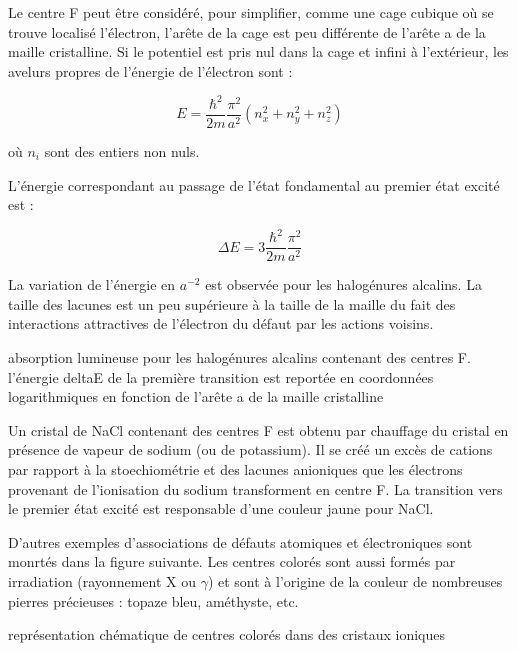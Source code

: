 Le centre F peut être considéré, pour simplifier, comme une cage cubique où se
trouve localisé l'électron, l'arête de la cage est peu différente de l'arête a
de la maille cristalline. Si le potentiel est pris nul dans la cage et infini à
l'extérieur, les avelurs propres de l'énergie de l'électron sont :
 
\begin{equation}
    E = \frac{\hbar^2}{2m}\frac{\pi^2}{a^2} (n_x^2 + n_y^2 + n_z^2)
\end{equation}

où $n_i$ sont des entiers non nuls.
 
L'énergie correspondant au passage de l'état fondamental au premier état excité
est :
 
\begin{equation}
    \Delta E = 3 \frac{\hbar^2}{2m} \frac{\pi^2}{a^2}
\end{equation}
 
La variation de l'énergie en $a^{-2}$ est observée pour les halogénures alcalins.
La taille des lacunes est un peu supérieure à la taille de la maille du fait des
interactions attractives de l'électron du défaut par les actions voisins.
 
\begin{marginfigure}
    \TODO
    \caption{absorption lumineuse pour les halogénures alcalins contenant des
    centres F. l'énergie deltaE de la première transition est reportée en
coordonnées logarithmiques en fonction de l'arête a de la maille cristalline}
    \label{abslumhalogalcal}
\end{marginfigure}
 
Un cristal de NaCl contenant des centres F est obtenu par chauffage du cristal
en présence de vapeur de sodium (ou de potassium). Il se créé un excès de
cations par rapport à la stoechiométrie et des lacunes anioniques que les
électrons provenant de l'ionisation du sodium transforment en centre F. La
transition vers le premier état excité est responsable d'une couleur jaune pour
NaCl.
 
D'autres exemples d'associations de défauts atomiques et électroniques sont
monrtés dans la figure suivante. Les centres colorés sont aussi formés par
irradiation (rayonnement X ou $\gamma$) et sont à l'origine de la couleur de
nombreuses pierres précieuses : topaze bleu, améthyste, etc.
 
\begin{marginfigure}
    \TODO
    \caption{représentation chématique de centres colorés dans des cristaux
    ioniques}
    \label{centrescolor}
\end{marginfigure}
